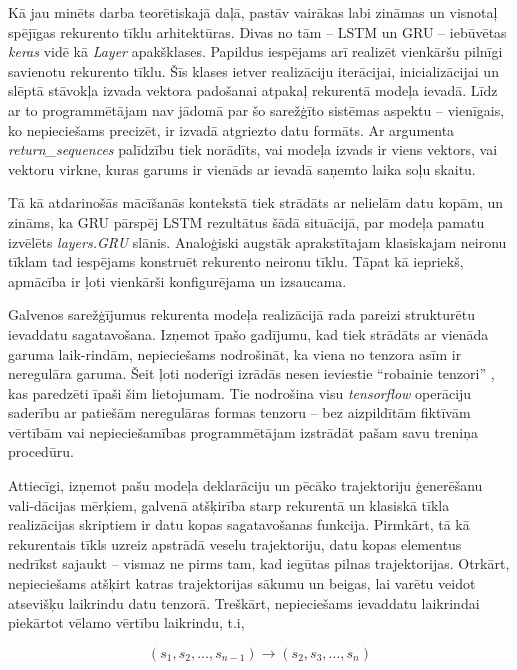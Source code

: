 \documentclass[12pt, a4paper]{article}
\numberwithin{equation}{section} %
\begin{document}
Kā jau minēts darba teorētiskajā daļā, pastāv vairākas labi zināmas un visnotaļ spējīgas rekurento tīklu arhitektūras. Divas no tām -- LSTM un GRU -- iebūvētas \textit{keras} vidē kā \textit{Layer} apakšklases. Papildus iespējams arī realizēt vienkāršu pilnīgi savienotu rekurento tīklu. Šīs klases ietver realizāciju iterācijai, inicializācijai un slēptā stāvokļa izvada vektora padošanai atpakaļ rekurentā modeļa ievadā. Līdz ar to programmētājam nav jādomā par šo sarežģīto sistēmas aspektu -- vienīgais, ko nepieciešams precizēt, ir izvadā atgriezto datu formāts. Ar argumenta \textit{return\_sequences} palīdzību tiek norādīts, vai modeļa izvads ir viens vektors, vai vektoru virkne, kuras garums ir vienāds ar ievadā saņemto laika soļu skaitu.

Tā kā atdarinošās mācīšanās kontekstā tiek strādāts ar nelielām datu kopām, un zināms, ka GRU pārspēj LSTM rezultātus šādā situācijā, par modeļa pamatu izvēlēts \textit{layers.GRU} slānis. Analoģiski augstāk aprakstītajam klasiskajam neironu tīklam tad iespējams konstruēt rekurento neironu tīklu. Tāpat kā iepriekš, apmācība ir ļoti vienkārši konfigurējama un izsaucama.

Galvenos sarežģījumus rekurenta modeļa realizācijā rada pareizi strukturētu ievaddatu sagatavošana. Izņemot īpašo gadījumu, kad tiek strādāts ar vienāda garuma laik-rindām, nepieciešams nodrošināt, ka viena no tenzora asīm ir neregulāra garuma. Šeit ļoti noderīgi izrādās nesen ieviestie ``robainie tenzori'' \cite{tf_ragged}, kas paredzēti īpaši šim lietojumam. Tie nodrošina visu \textit{tensorflow} operāciju saderību ar patiešām neregulāras formas tenzoru -- bez aizpildītām fiktīvām vērtībām vai nepieciešamības programmētājam izstrādāt pašam savu treniņa procedūru.

Attiecīgi, izņemot pašu modeļa deklarāciju un pēcāko trajektoriju ģenerēšanu vali-dācijas mērķiem, galvenā atšķirība starp rekurentā un klasiskā tīkla realizācijas skriptiem ir datu kopas sagatavošanas funkcija. Pirmkārt, tā kā rekurentais tīkls uzreiz apstrādā veselu trajektoriju, datu kopas elementus nedrīkst sajaukt -- vismaz ne pirms tam, kad iegūtas pilnas trajektorijas. Otrkārt, nepieciešams atšķirt katras trajektorijas sākumu un beigas, lai varētu veidot atsevišķu laikrindu datu tenzorā. Treškārt, nepieciešams ievaddatu laikrindai piekārtot vēlamo vērtību laikrindu, t.i,


\begin{equation}
    (s_1, s_2, ..., s_{n-1} ) \rightarrow (s_2, s_3, ..., s_n )
\end{equation}
\end{document}
